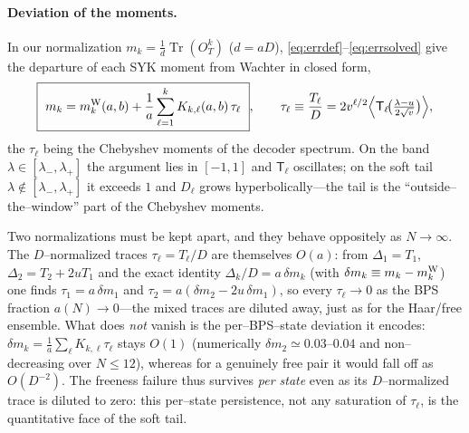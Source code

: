 \documentclass[11pt]{article}
\newcommand{\Tr}{\operatorname{Tr}}
\newcommand{\OT}{O_T}
\begin{document}
\paragraph{Deviation of the moments.} In our normalization $m_k=\tfrac1d\Tr(\OT^k)$ ($d=aD$),
\eqref{eq:errdef}--\eqref{eq:errsolved} give the departure of each SYK moment from Wachter in closed
form,
\begin{equation}
  \boxed{\ m_k=m_k^{\rm W}(a,b)+\frac1a\sum_{\ell=1}^k K_{k,\ell}(a,b)\,\tau_\ell\ },
  \qquad \tau_\ell\equiv\frac{T_\ell}{D}=2v^{\ell/2}\Big\langle \mathsf T_\ell\!\big(\tfrac{\lambda-u}{2\sqrt v}\big)\Big\rangle,
  \label{eq:mdev}
\end{equation}
the $\tau_\ell$ being the Chebyshev moments of the decoder spectrum. On the band
$\lambda\in[\lambda_-,\lambda_+]$ the argument lies in $[-1,1]$ and $\mathsf T_\ell$ oscillates; on the
soft tail $\lambda\notin[\lambda_-,\lambda_+]$ it exceeds $1$ and $D_\ell$ grows hyperbolically---the
tail is the ``outside--the--window'' part of the Chebyshev moments.

Two normalizations must be kept apart, and they behave oppositely as $N\to\infty$. The $D$--normalized
traces $\tau_\ell=T_\ell/D$ are themselves $O(a)$: from $\Delta_1=T_1$, $\Delta_2=T_2+2uT_1$ and the
exact identity $\Delta_k/D=a\,\delta m_k$ (with $\delta m_k\equiv m_k-m_k^{\rm W}$) one finds
$\tau_1=a\,\delta m_1$ and $\tau_2=a(\delta m_2-2u\,\delta m_1)$, so every $\tau_\ell\to0$ as the BPS
fraction $a(N)\to0$---the mixed traces are diluted away, just as for the Haar/free ensemble. What does
\emph{not} vanish is the per--BPS--state deviation it encodes: $\delta m_k=\tfrac1a\sum_\ell
K_{k,\ell}\tau_\ell$ stays $O(1)$ (numerically $\delta m_2\simeq0.03$--$0.04$ and non--decreasing over
$N\le12$), whereas for a genuinely free pair it would fall off as $O(D^{-2})$. The freeness failure thus
survives \emph{per state} even as its $D$--normalized trace is diluted to zero: this per--state
persistence, not any saturation of $\tau_\ell$, is the quantitative face of the soft tail.
\end{document}
